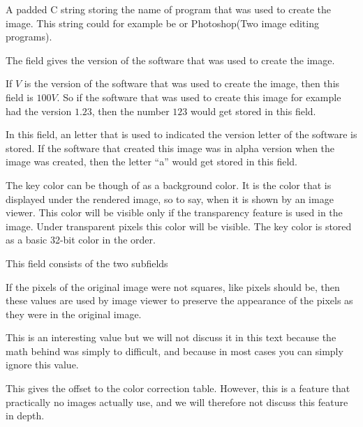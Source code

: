 
A \nullm padded C string storing the name of program that was used to
create the image. This string could for example be \gimp or
Photoshop(Two image editing programs).


The field gives the version of the software that was used to create
the image.


If $V$ is the version of the software that was used to create the
image, then this field is $100V$. So if the software that was
used to create this image for example had the version $1.23$, then the
number $123$ would get stored in this field.


In this field, an \ascii letter that is used to indicated the version
letter of the software is stored. If the software that created this
image was in alpha version when the image was created, then the letter
``a'' would get stored in this field.


The key color can be though of as a background color. It is the color
that is displayed under the rendered image, so to say, when it is
shown by an image viewer. This color will be visible only if the
transparency feature is used in the image. Under transparent pixels
this color will be visible. The key color is stored as a basic 32-bit
color in the \argb order.


This field consists of the two subfields


If the pixels of the original image were not squares, like pixels
should be, then these values are used by image viewer to preserve the
appearance of the pixels as they were in the original image.


This is an interesting value but we will not discuss it in this text
because the math behind was simply to difficult, and because in most
cases you can simply ignore this value.


This gives the offset to the color correction table. However, this is
a feature that practically no \tga images actually use, and we will
therefore not discuss this feature in depth.

